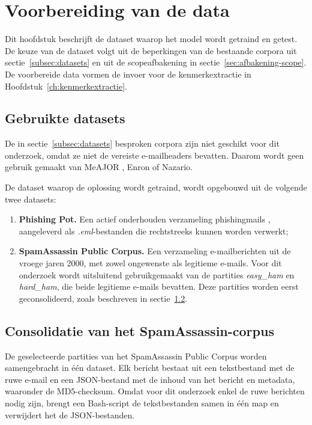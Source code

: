 \chapter{Voorbereiding van de data}%
\label{ch:data}

Dit hoofdstuk beschrijft de dataset waarop het model wordt getraind en getest. De keuze van de dataset volgt uit de beperkingen van de bestaande corpora uit sectie~\ref{subsec:datasets} en uit de scopeafbakening in sectie~\ref{sec:afbakening-scope}. De voorbereide data vormen de invoer voor de kenmerkextractie in Hoofdstuk~\ref{ch:kenmerkextractie}.

\section{Gebruikte datasets}%
\label{sec:gebruikte-datasets}

De in sectie~\ref{subsec:datasets} besproken corpora zijn niet geschikt voor dit onderzoek, omdat ze niet de vereiste e-mailheaders bevatten. Daarom wordt geen gebruik gemaakt van MeAJOR \autocite{Mendes2025}, Enron \autocite{klimt2004} of Nazario.

De dataset waarop de oplossing wordt getraind, wordt opgebouwd uit de volgende twee datasets:
\begin{enumerate}
    \item \textbf{Phishing Pot.} Een actief onderhouden verzameling phishingmails \autocite{PhishingPot}, aangeleverd als \emph{.eml}-bestanden die rechtstreeks kunnen worden verwerkt;
    \item \textbf{SpamAssassin Public Corpus.} Een verzameling e-mailberichten uit de vroege jaren 2000, met zowel ongewenste als legitieme e-mails. Voor dit onderzoek wordt uitsluitend gebruikgemaakt van de partities \emph{easy\_ham} en \emph{hard\_ham}, die beide legitieme e-mails bevatten. Deze partities worden eerst geconsolideerd, zoals beschreven in sectie~\ref{sec:consolidatie-spamassassin}.
\end{enumerate}

\section{Consolidatie van het SpamAssassin-corpus}%
\label{sec:consolidatie-spamassassin}

De geselecteerde partities van het SpamAssassin Public Corpus worden samengebracht in één dataset. Elk bericht bestaat uit een tekstbestand met de ruwe e-mail en een JSON-bestand met de inhoud van het bericht en metadata, waaronder de MD5-checksum. Omdat voor dit onderzoek enkel de ruwe berichten nodig zijn, brengt een Bash-script de tekstbestanden samen in één map en verwijdert het de JSON-bestanden.

